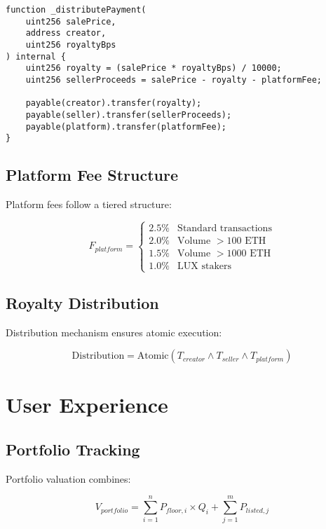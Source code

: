 \documentclass[11pt,a4paper]{article}
\begin{document}
\begin{lstlisting}[language=Solidity]
function _distributePayment(
    uint256 salePrice,
    address creator,
    uint256 royaltyBps
) internal {
    uint256 royalty = (salePrice * royaltyBps) / 10000;
    uint256 sellerProceeds = salePrice - royalty - platformFee;
    
    payable(creator).transfer(royalty);
    payable(seller).transfer(sellerProceeds);
    payable(platform).transfer(platformFee);
}
\end{lstlisting}

\subsection{Platform Fee Structure}

Platform fees follow a tiered structure:

\begin{equation}
F_{platform} = \begin{cases}
2.5\% & \text{Standard transactions} \\
2.0\% & \text{Volume } > 100 \text{ ETH} \\
1.5\% & \text{Volume } > 1000 \text{ ETH} \\
1.0\% & \text{LUX stakers}
\end{cases}
\end{equation}

\subsection{Royalty Distribution}

Distribution mechanism ensures atomic execution:

\begin{equation}
\text{Distribution} = \text{Atomic}\left( T_{creator} \land T_{seller} \land T_{platform} \right)
\end{equation}

\section{User Experience}

\subsection{Portfolio Tracking}

Portfolio valuation combines:

\begin{equation}
V_{portfolio} = \sum_{i=1}^{n} P_{floor,i} \times Q_i + \sum_{j=1}^{m} P_{listed,j}
\end{equation}
\end{document}

